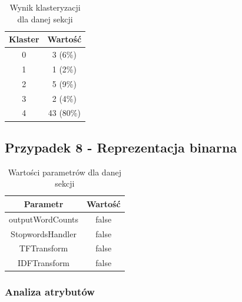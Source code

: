 \documentclass[../EDI_Task2_Karwowski_Kowalewski.tex]{subfiles}
\begin{document}
{{{            \begin{table}[!htbp]
                \small
                \centering
                \begin{tabular}{|c|c|}
                    \hline
                    Klaster & Wartość \\ \hline
                    0   &   3 (6\%) \\
                    1   &   1 (2\%) \\
                    2   &   5 (9\%) \\
                    3   &   2 (4\%) \\
                    4   &  43 (80\%) \\ \hline
                \end{tabular}
                \caption{Wynik klasteryzacji dla danej sekcji}
            \end{table}
            \FloatBarrier
        }
    }

    \subsection{Przypadek 8 - Reprezentacja binarna} {

        \begin{table}[!htbp]
            \small
            \centering
            \begin{tabular}{|c|c|}
                \hline
                Parametr & Wartość \\ \hline
                outputWordCounts & false \\ \hline
                StopwordsHandler & false \\ \hline
                TFTransform & false \\ \hline
                IDFTransform & false \\ \hline
            \end{tabular}
            \caption{Wartości parametrów dla danej sekcji}
        \end{table}
        \FloatBarrier

        \subsubsection{Analiza atrybutów} {

}}}
\end{document}
